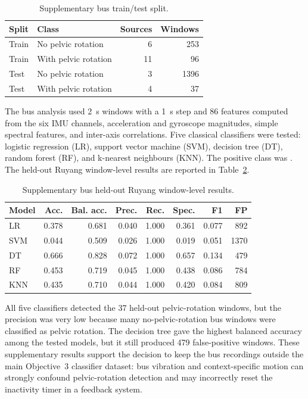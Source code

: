 \begin{table}[!htbp]
    \centering
    \footnotesize
    \caption{Supplementary bus train/test split.}
    \label{tab:bus_supplementary_split}
    \begin{tabular*}{\linewidth}{@{\extracolsep{\fill}}llrr@{}}
        \toprule
        Split & Class & Sources & Windows \\
        \midrule
        Train & No pelvic rotation & 6 & 253 \\
        Train & With pelvic rotation & 11 & 96 \\
        Test & No pelvic rotation & 3 & 1396 \\
        Test & With pelvic rotation & 4 & 37 \\
        \bottomrule
    \end{tabular*}
\end{table}

The bus analysis used 2~s windows with a 1~s step and 86 features computed from
the six IMU channels, acceleration and gyroscope magnitudes, simple spectral
features, and inter-axis correlations. Five classical classifiers were tested:
logistic regression (LR), support vector machine (SVM), decision tree (DT),
random forest (RF), and k-nearest neighbours (KNN). The positive class was
. The held-out Ruyang window-level results are
reported in Table~\ref{tab:bus_supplementary_results}.

\begin{table}[!htbp]
    \centering
    \scriptsize
    \caption{Supplementary bus held-out Ruyang window-level results.}
    \label{tab:bus_supplementary_results}
    \begin{tabular*}{\linewidth}{@{\extracolsep{\fill}}lrrrrrrr@{}}
        \toprule
        Model & Acc. & Bal. acc. & Prec. & Rec. & Spec. & F1 & FP \\
        \midrule
        LR  & 0.378 & 0.681 & 0.040 & 1.000 & 0.361 & 0.077 & 892 \\
        SVM & 0.044 & 0.509 & 0.026 & 1.000 & 0.019 & 0.051 & 1370 \\
        DT  & 0.666 & 0.828 & 0.072 & 1.000 & 0.657 & 0.134 & 479 \\
        RF  & 0.453 & 0.719 & 0.045 & 1.000 & 0.438 & 0.086 & 784 \\
        KNN & 0.435 & 0.710 & 0.044 & 1.000 & 0.420 & 0.084 & 809 \\
        \bottomrule
    \end{tabular*}
\end{table}

All five classifiers detected the 37 held-out pelvic-rotation windows, but the
precision was very low because many no-pelvic-rotation bus windows were
classified as pelvic rotation. The decision tree gave the highest balanced
accuracy among the tested models, but it still produced 479 false-positive
windows. These supplementary results support the decision to keep the bus
recordings outside the main Objective~3 classifier dataset: bus vibration and
context-specific motion can strongly confound pelvic-rotation detection and may
incorrectly reset the inactivity timer in a feedback system.
